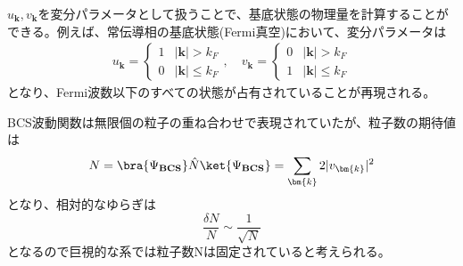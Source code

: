 \documentclass[dvipdfmx, 11pt, a4paper]{jsarticle}
\numberwithin{equation}{section}
\theoremstyle{definition}
\begin{document}
    $u_{\bm{k}},v_{\bm{k}}$を変分パラメータとして扱うことで、基底状態の物理量を計算することができる。例えば、常伝導相の基底状態(Fermi真空)において、変分パラメータは
    \begin{align}
        u_{\bm{k}} = 
        \left\{
        \begin{matrix}
            1& |\bm{k}| > k_F\\
            0& |\bm{k}| \le k_F
        \end{matrix}
        \right. ,\quad
        v_{\bm{k}} = 
        \left\{
        \begin{matrix}
            0& |\bm{k}| > k_F\\
            1& |\bm{k}| \le k_F
        \end{matrix}
        \right.
    \end{align}
    となり、Fermi波数以下のすべての状態が占有されていることが再現される。
    \begin{note}[粒子数のゆらぎ]
        BCS波動関数は無限個の粒子の重ね合わせで表現されていたが、粒子数の期待値は
        \begin{equation}
            N = \bra{\Psi_{\textbf{BCS}}} \hat{N} \ket{\Psi_{\textbf{BCS}}} = \sum_{\bm{k}} 2|v_{\bm{k}}|^2
        \end{equation}
        となり、相対的なゆらぎは
        \begin{equation}
            \frac{\delta N}{N} \sim \frac{1}{\sqrt{N}}
        \end{equation}
        となるので巨視的な系では粒子数Nは固定されていると考えられる。
    \end{note}
\end{document}

